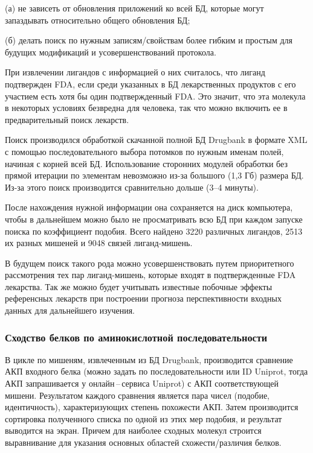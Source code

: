 \documentclass[a4paper,14pt]{article}         %
\begin{document}
(а) не зависеть от обновления приложений ко всей БД, которые могут запаздывать относительно общего обновления БД; 

(б) делать поиск по нужным записям/свойствам более гибким и простым для будущих модификаций и усовершенствований протокола.

При извлечении лигандов с информацией о них считалось, что лиганд подтвержден FDA, если среди указанных в БД лекарственных продуктов с его участием есть хотя бы один подтвержденный FDA. Это значит, что эта молекула в некоторых условиях безвредна для человека, так что можно включить ее в предварительный поиск лекарств. 

Поиск производился обработкой скачанной полной БД Drugbank в формате XML с помощью последовательного выбора потомков по нужным именам полей, начиная с корней всей БД. Использование сторонних модулей обработки без прямой итерации по элементам невозможно из-за большого (1,3 Гб) размера БД. Из-за этого поиск производится сравнительно дольше (3--4 минуты).

После нахождения нужной информации она сохраняется на диск компьютера, чтобы в дальнейшем можно было не просматривать всю БД при каждом запуске поиска по коэффициент подобия. Всего найдено 3220 различных лигандов, 2513 их разных мишеней и 9048 связей лиганд-мишень.


В будущем поиск такого рода можно усовершенствовать путем приоритетного рассмотрения тех пар лиганд-мишень, которые входят в подтвержденные FDA лекарства. Так же можно будет учитывать известные побочные эффекты референсных лекарств при построении прогноза перспективности входных данных для дальнейшего изучения.

\subsubsection{Сходство белков по аминокислотной последовательности}

В цикле по мишеням, извлеченным из БД Drugbank, производится сравнение АКП входного белка (можно задать по последовательности или ID Uniprot, тогда АКП запрашивается у онлайн\,--\,сервиса Uniprot) с АКП соответствующей мишени. Результатом каждого сравнения является пара чисел (подобие, идентичность), характеризующих степень похожести АКП. Затем производится сортировка полученного списка по одной из этих мер подобия, и результат выводится на экран. Причем для наиболее сходных молекул строится выравнивание для указания основных областей схожести/различия белков.
\end{document}
